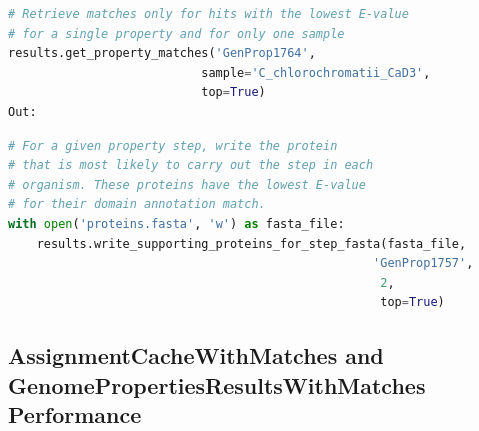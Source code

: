 \begin{lstlisting}[language=Python]  
# Retrieve matches only for hits with the lowest E-value 
# for a single property and for only one sample                                     
results.get_property_matches('GenProp1764', 
                           sample='C_chlorochromatii_CaD3',
                           top=True)
Out:
\end{lstlisting}

\begin{table}[!ht]
\centering
{}
\end{table}

\begin{lstlisting}[language=Python]  
# For a given property step, write the protein 
# that is most likely to carry out the step in each 
# organism. These proteins have the lowest E-value
# for their domain annotation match.                                 
with open('proteins.fasta', 'w') as fasta_file:
    results.write_supporting_proteins_for_step_fasta(fasta_file, 
                                                   'GenProp1757', 
                                                    2, 
                                                    top=True)
\end{lstlisting}

\subsection{AssignmentCacheWithMatches and GenomePropertiesResultsWithMatches Performance}

